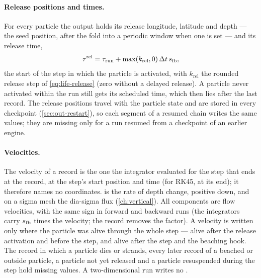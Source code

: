 \paragraph{Release positions and times.} For every particle the output holds its release longitude, latitude
and depth --- the seed position, after the fold into a periodic window when one is set --- and its release
time,
\begin{equation}\label{eq:out-release}
  \tau^{\text{rel}}=\tau_{\text{run}}+\max(k_{\text{rel}},0)\,\Delta t\,s_{\mathrm{fb}},
\end{equation}
the start of the step in which the particle is activated, with $k_{\text{rel}}$ the rounded release step of
\cref{eq:life-release} (zero without a delayed release). A particle never activated within the run still
gets its scheduled time, which then lies after the last record. The release positions travel with the
particle state and are stored in every checkpoint (\cref{sec:out-restart}), so each segment of a resumed chain
writes the same values; they are missing only for a run resumed from a checkpoint of an earlier engine.

\paragraph{Velocities.} The velocity of a record is the one the integrator evaluated for
the step that ends at the record, at the step's start position and time (for RK45, at its end); it therefore
names no coordinates.  is the rate of depth change, positive down, and on a sigma mesh the
dia-sigma flux (\cref{ch:vertical}). All components are flow velocities, with the same sign in forward and
backward runs (the integrators carry $s_{\mathrm{fb}}$ times the velocity; the record removes the factor). A velocity is
written only where the particle was alive through the whole step --- alive after the release activation and
before the step, and alive after the step and the beaching hook. The record in which a particle dies or
strands, every later record of a beached or outside particle, a particle not yet released and a particle
resuspended during the step hold missing values. A two-dimensional run writes no .

